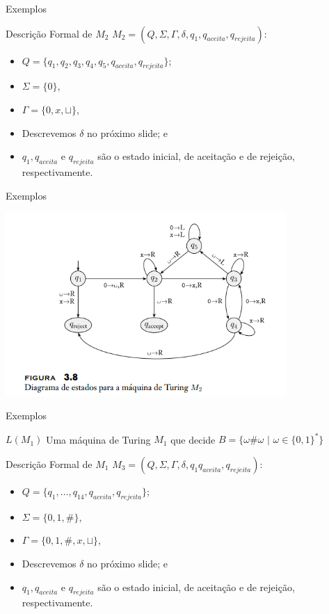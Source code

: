 \documentclass[xcolor=dvipsnames,table]{beamer}
\begin{document}
	\begin{frame}{Exemplos}
		\begin{block}{Descrição Formal de $M_2$}
			$M_2 = (Q, \Sigma, \Gamma, \delta, q_1, q_{aceita}, q_{rejeita})$:
			\begin{itemize}
				\item $Q = \{ q_1, q_2, q_3, q_4, q_5, q_{aceita}, q_{rejeita} \}$;
				\item $\Sigma = \{ 0 \}$,
				\item $\Gamma = \{ 0, x, \sqcup \}$,
				\item Descrevemos $\delta$ no próximo slide; e
				\item $q_1, q_{aceita}$ e $q_{rejeita}$ são o estado inicial, de aceitação e de rejeição, respectivamente.
			\end{itemize}
		\end{block}
	\end{frame}
	
	\begin{frame}{Exemplos}
		\begin{center}
			\includegraphics[height=7cm]{images/fig38.png}
		\end{center}
	\end{frame}
	
	\begin{frame}{Exemplos}
		\begin{block}{$L(M_1)$}
			Uma máquina de Turing $M_1$ que decide $B = \{ \omega \# \omega \mbox{ | } \omega \in \{ 0, 1 \}^* \}$		
		\end{block} \pause
		\begin{block}{Descrição Formal de $M_1$}
			$M_3 = (Q, \Sigma, \Gamma, \delta, q_1 q_{aceita}, q_{rejeita})$:
			\begin{itemize}
				\item $Q = \{ q_1, \ldots, q_{14}, q_{aceita}, q_{rejeita} \}$;
				\item $\Sigma = \{ 0, 1, \# \}$,
				\item $\Gamma = \{ 0, 1, \#, x, \sqcup \}$,
				\item Descrevemos $\delta$ no próximo slide; e
				\item $q_1, q_{aceita}$ e $q_{rejeita}$ são o estado inicial, de aceitação e de rejeição, respectivamente.
			\end{itemize}
		\end{block}
	\end{frame}
	
\end{document}
